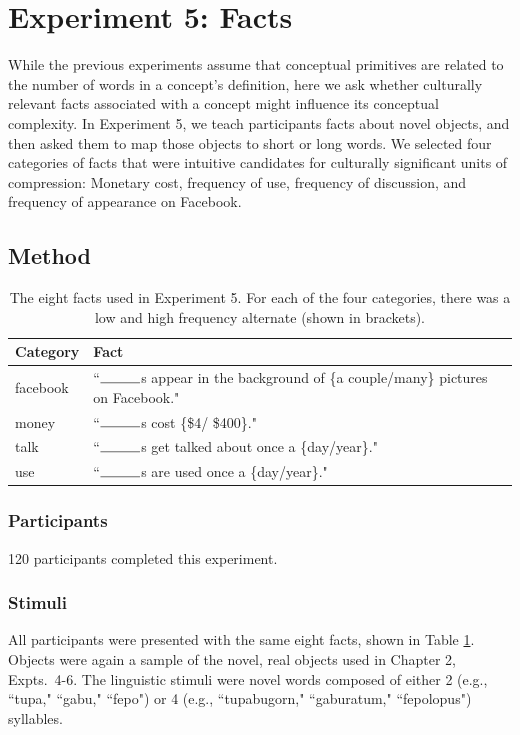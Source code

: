 \section{Experiment 5: Facts}
While the previous experiments assume that conceptual primitives are related to the number of words in a concept's definition, here we ask whether culturally relevant facts associated with a concept might influence its conceptual complexity. In Experiment 5,  we teach participants facts about novel objects, and then asked them to map those objects to short or long words. We selected four categories of facts  that were intuitive candidates for culturally significant units of compression: Monetary cost, frequency of use, frequency of discussion, and frequency of appearance on Facebook.

\subsection{Method}

\begin{table}[t!]
\centering

\begin{tabular}{ll}
\toprule
\textbf{Category} & \textbf{Fact}               \\
\toprule
   facebook & ``$\rule{1cm}{0.15mm}$s appear in the background of \{a couple/many\} pictures on Facebook."\\
   money  &  ``$\rule{1cm}{0.15mm}$s cost \{\$4/ \$400\}."   \\
   talk  & ``$\rule{1cm}{0.15mm}$s get talked about once a \{day/year\}." \\
   use    & ``$\rule{1cm}{0.15mm}$s are used once a \{day/year\}."                             \\

 \bottomrule
\end{tabular}
\caption{The eight facts used in Experiment 5. For each of the four categories, there was a low and high frequency alternate (shown in  brackets).}
\label{tab:facts}
\end{table}

\subsubsection{Participants}
120 participants completed this experiment. 
\subsubsection{Stimuli}
All participants were presented with the same eight facts, shown in Table \ref{tab:facts}. Objects were again a sample of the novel, real objects used in Chapter 2, Expts.\ 4-6.  The linguistic stimuli were novel words composed of either 2 (e.g., ``tupa," ``gabu," ``fepo")  or 4  (e.g., ``tupabugorn," ``gaburatum," ``fepolopus")  syllables.

